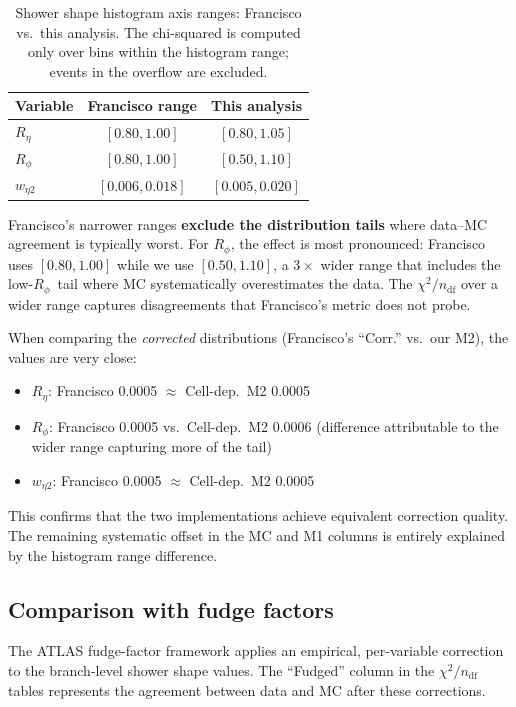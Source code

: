 \documentclass[11pt,a4paper]{article}
\newcommand{\Reta}{\ensuremath{R_{\eta}}}
\newcommand{\Rphi}{\ensuremath{R_{\phi}}}
\newcommand{\weta}{\ensuremath{w_{\eta 2}}}
\newcommand{\chisq}{\ensuremath{\chi^2 / n_{\mathrm{df}}}}
\begin{document}
\begin{table}[htbp]
\centering
\caption{Shower shape histogram axis ranges: Francisco vs.\ this
  analysis.  The chi-squared is computed only over bins within the
  histogram range; events in the overflow are excluded.}
\label{tab:axis-ranges}
\begin{tabular}{lcc}
\toprule
Variable & Francisco range & This analysis \\
\midrule
\Reta  & $[0.80, 1.00]$ & $[0.80, 1.05]$ \\
\Rphi  & $[0.80, 1.00]$ & $[0.50, 1.10]$ \\
\weta  & $[0.006, 0.018]$ & $[0.005, 0.020]$ \\
\bottomrule
\end{tabular}
\end{table}

Francisco's narrower ranges \textbf{exclude the distribution tails}
where data--MC agreement is typically worst.  For \Rphi, the effect is
most pronounced: Francisco uses $[0.80, 1.00]$ while we use
$[0.50, 1.10]$, a $3\times$ wider range that includes the low-\Rphi\
tail where MC systematically overestimates the data.  The $\chisq$ over
a wider range captures disagreements that Francisco's metric does not
probe.

When comparing the \emph{corrected} distributions (Francisco's ``Corr.''
vs.\ our M2), the values are very close:
\begin{itemize}
  \item \Reta: Francisco 0.0005 $\approx$ Cell-dep.\ M2 0.0005
  \item \Rphi: Francisco 0.0005 vs.\ Cell-dep.\ M2 0.0006 (difference
        attributable to the wider range capturing more of the tail)
  \item \weta: Francisco 0.0005 $\approx$ Cell-dep.\ M2 0.0005
\end{itemize}
This confirms that the two implementations achieve equivalent correction
quality.  The remaining systematic offset in the MC and M1 columns is
entirely explained by the histogram range difference.

\subsection{Comparison with fudge factors}
\label{sec:disc-fudge}

The ATLAS fudge-factor framework applies an empirical, per-variable
correction to the branch-level shower shape values.  The ``Fudged''
column in the $\chisq$ tables represents the agreement between data
and MC after these corrections.
\end{document}
